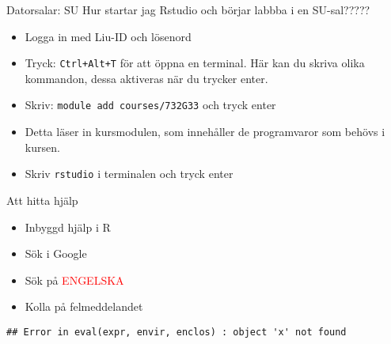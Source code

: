 \documentclass[
  10pt,
  ignorenonframetext,
]{beamer}
\providecommand{\tightlist}{%
  \setlength{\itemsep}{0pt}\setlength{\parskip}{0pt}}
\begin{document}
\begin{frame}{Datorsalar: SU}
Hur startar jag Rstudio och börjar labbba i en SU-sal?????
\begin{itemize}
\tightlist
\item
 Logga in med Liu-ID och lösenord
\item
  Tryck: \texttt{Ctrl+Alt+T} för att öppna en terminal. Här kan du skriva olika kommandon, dessa aktiveras när du trycker enter.
\item
  Skriv: \texttt{module add courses/732G33} och tryck enter
\item
  Detta läser in kursmodulen, som innehåller de programvaror som behövs i kursen.
\item
  Skriv \texttt{rstudio} i terminalen och tryck enter
\end{itemize}
\end{frame}




\begin{frame}[fragile]{Att hitta hjälp}
\protect\hypertarget{att-hitta-hjuxe4lp}{}
\begin{itemize}
\tightlist
\item
  Inbyggd hjälp i R
\item
  Sök i Google
\item
  Sök på \textcolor{red}{ENGELSKA}
\item
  Kolla på felmeddelandet
\end{itemize}

\begin{verbatim}
## Error in eval(expr, envir, enclos) : object 'x' not found
\end{verbatim}
\end{frame}

\end{document}
